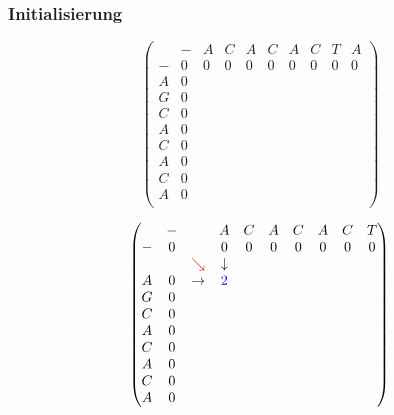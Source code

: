 \documentclass{beamer}
\begin{document}
\begin{frame}
	\frametitle{Initialisierung}
	\[
\begin{pmatrix}
          & - & A & C & A & C & A & C & T & A  \\
	- & 0 & 0 & 0 & 0 & 0 & 0 & 0 & 0 & 0  \\
	A & 0 &   &   &   &   &   &   &   &    \\
	G & 0 &   &   &   &   &   &   &   &    \\
	C & 0 &   &   &   &   &   &   &   &    \\
	A & 0 &   &   &   &   &   &   &   &    \\
	C & 0 &   &   &   &   &   &   &   &    \\
	A & 0 &   &   &   &   &   &   &   &    \\
	C & 0 &   &   &   &   &   &   &   &    \\
	A & 0 &   &   &   &   &   &   &   &    \\
\end{pmatrix}
\]
\end{frame}

\begin{frame}
	\[
\begin{pmatrix}
	  & - &                & A & C & A & C & A & C & T \\
	- & 0 &                & 0 & 0 & 0 & 0 & 0 & 0 & 0  \\
	  &   &    \color{red} \searrow   & \downarrow  &   &   &   &   &   &    \\
	A & 0 &     \rightarrow&\color{blue}2    &   &   &   &   &   &    \\
	G & 0 &                &   &   &   &   &   &   &    \\
	C & 0 &                &   &   &   &   &   &   &    \\
	A & 0 &                &   &   &   &   &   &   &    \\
	C & 0 &                &   &   &   &   &   &   &    \\
	A & 0 &                &   &   &   &   &   &   &    \\
	C & 0 &                &   &   &   &   &   &   &    \\    
	A & 0 &                &   &   &   &   &   &   &    
\end{pmatrix}
\]
\end{frame}
\end{document}
